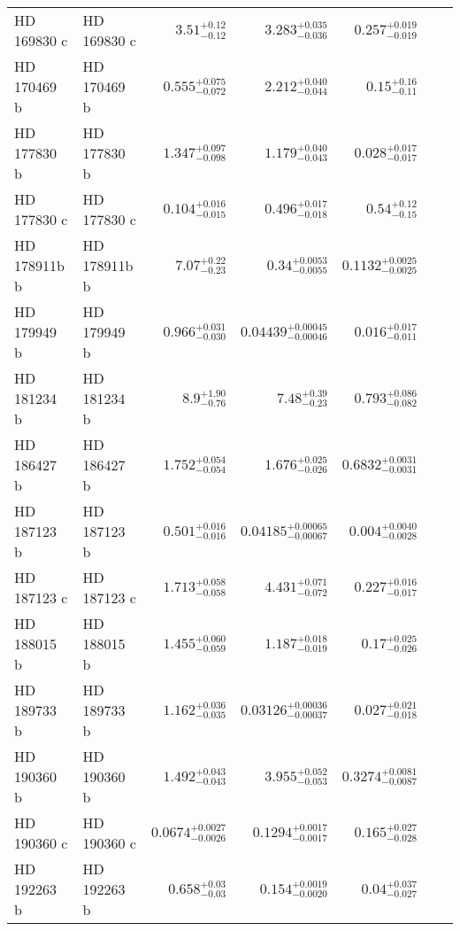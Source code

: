\begin{longtable*}{llrrrrr}
HD 169830 c & HD 169830 c & $3.51^{+0.12}_{-0.12}$ & $3.283^{+0.035}_{-0.036}$ & $0.257^{+0.019}_{-0.019}$ & \cite{Mayor04} & \\ 
HD 170469 b & HD 170469 b & $0.555^{+0.075}_{-0.072}$ & $2.212^{+0.040}_{-0.044}$ & $0.15^{+0.16}_{-0.11}$ & \cite{Fischer07} & \\ 
HD 177830 b & HD 177830 b & $1.347^{+0.097}_{-0.098}$ & $1.179^{+0.040}_{-0.043}$ & $0.028^{+0.017}_{-0.017}$ & \cite{Butler06} & \\ 
HD 177830 c & HD 177830 c & $0.104^{+0.016}_{-0.015}$ & $0.496^{+0.017}_{-0.018}$ & $0.54^{+0.12}_{-0.15}$ & \cite{Meschiari11} & \\ 
HD 178911b b & HD 178911b b & $7.07^{+0.22}_{-0.23}$ & $0.34^{+0.0053}_{-0.0055}$ & $0.1132^{+0.0025}_{-0.0025}$ & \cite{Zucker02} & \\ 
HD 179949 b & HD 179949 b & $0.966^{+0.031}_{-0.030}$ & $0.04439^{+0.00045}_{-0.00046}$ & $0.016^{+0.017}_{-0.011}$ & \cite{Tiney01} & \\ 
HD 181234 b & HD 181234 b & $8.9^{+1.90}_{-0.76}$ & $7.48^{+0.39}_{-0.23}$ & $0.793^{+0.086}_{-0.082}$ & \cite{Rickman19} & \\ 
HD 186427 b & HD 186427 b & $1.752^{+0.054}_{-0.054}$ & $1.676^{+0.025}_{-0.026}$ & $0.6832^{+0.0031}_{-0.0031}$ & \cite{Chochran97} & \\ 
HD 187123 b & HD 187123 b & $0.501^{+0.016}_{-0.016}$ & $0.04185^{+0.00065}_{-0.00067}$ & $0.004^{+0.0040}_{-0.0028}$ & \cite{Vogt00} & \\ 
HD 187123 c & HD 187123 c & $1.713^{+0.058}_{-0.058}$ & $4.431^{+0.071}_{-0.072}$ & $0.227^{+0.016}_{-0.017}$ & \cite{Wright09} & \\ 
HD 188015 b & HD 188015 b & $1.455^{+0.060}_{-0.059}$ & $1.187^{+0.018}_{-0.019}$ & $0.17^{+0.025}_{-0.026}$ & \cite{Marcy05} & \\ 
HD 189733 b & HD 189733 b & $1.162^{+0.036}_{-0.035}$ & $0.03126^{+0.00036}_{-0.00037}$ & $0.027^{+0.021}_{-0.018}$ & \cite{Bouchy05} & \\ 
HD 190360 b & HD 190360 b & $1.492^{+0.043}_{-0.043}$ & $3.955^{+0.052}_{-0.053}$ & $0.3274^{+0.0081}_{-0.0087}$ & \cite{Naef03} & \\ 
HD 190360 c & HD 190360 c & $0.0674^{+0.0027}_{-0.0026}$ & $0.1294^{+0.0017}_{-0.0017}$ & $0.165^{+0.027}_{-0.028}$ & \cite{Vogt05} & \\ 
HD 192263 b & HD 192263 b & $0.658^{+0.03}_{-0.03}$ & $0.154^{+0.0019}_{-0.0020}$ & $0.04^{+0.037}_{-0.027}$ & \cite{Santos00} & \\ 

\end{longtable*}
